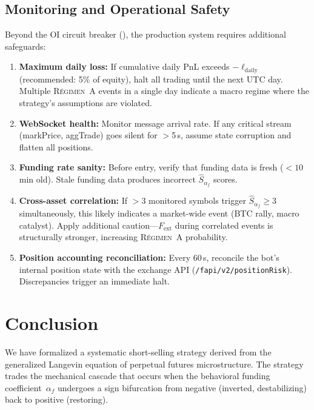 \documentclass[11pt,a4paper]{article}
\newcommand{\af}{\alpha_f}
\newcommand{\Fext}{F_{\mathrm{ext}}}
\newcommand{\regime}[1]{\textsc{R\'{e}gimen~#1}}
\begin{document}
\subsection{Monitoring and Operational Safety}

Beyond the OI circuit breaker (), the production system 
requires additional safeguards:

\begin{enumerate}[nosep]
    \item \textbf{Maximum daily loss:} If cumulative daily PnL exceeds 
    $-\ell_{\mathrm{daily}}$ (recommended: 5\% of equity), halt all trading 
    until the next UTC day. Multiple \regime{A} events in a single day indicate 
    a macro regime where the strategy's assumptions are violated.
    
    \item \textbf{WebSocket health:} Monitor message arrival rate. If any 
    critical stream (markPrice, aggTrade) goes silent for $>$5\,s, assume 
    state corruption and flatten all positions.
    
    \item \textbf{Funding rate sanity:} Before entry, verify that funding data 
    is fresh ($< 10$\,min old). Stale funding data produces incorrect 
    $\hat{S}_{\af}$ scores.
    
    \item \textbf{Cross-asset correlation:} If $>$3 monitored symbols trigger 
    $\hat{S}_{\af} \ge 3$ simultaneously, this likely indicates a market-wide 
    event (BTC rally, macro catalyst). Apply additional caution---$\Fext$ during 
    correlated events is structurally stronger, increasing \regime{A} 
    probability.
    
    \item \textbf{Position accounting reconciliation:} Every 60\,s, reconcile 
    the bot's internal position state with the exchange API 
    (\texttt{/fapi/v2/positionRisk}). Discrepancies trigger an immediate halt.
\end{enumerate}


\section{Conclusion}
\label{sec:conclusion}

We have formalized a systematic short-selling strategy derived from the 
generalized Langevin equation of perpetual futures microstructure. The strategy 
trades the mechanical cascade that occurs when the behavioral funding 
coefficient~$\af$ undergoes a sign bifurcation from negative (inverted, 
destabilizing) back to positive (restoring).
\end{document}
